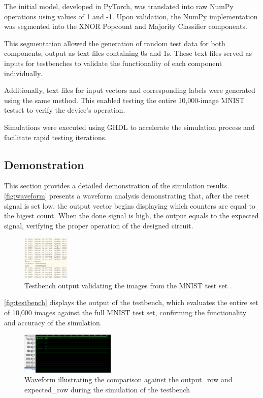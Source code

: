 \documentclass[conference]{IEEEtran}
\begin{document}
The initial model, developed in PyTorch, was translated into raw NumPy operations using values of 1 and -1. Upon validation, the NumPy implementation was segmented into the XNOR Popcount and Majority Classifier components.

This segmentation allowed the generation of random test data for both components, output as text files containing 0s and 1s. These text files served as inputs for testbenches to validate the functionality of each component individually.

Additionally, text files for input vectors and corresponding labels were generated using the same method. This enabled testing the entire 10,000-image MNIST \cite{mnist} testset to verify the device's operation.

Simulations were executed using GHDL \cite{ghdl} to accelerate the simulation process and facilitate rapid testing iterations.



\subsection{Demonstration}
This section provides a detailed demonstration of the simulation results. 
\autoref{fig:waveform} presents a waveform analysis demonstrating that, after the reset signal is set low, the output vector begins displaying which counters are equal to the higest count. When the done signal is high, the output equals to the expected signal, verifying the proper operation of the designed circuit.

\begin{figure}[h]
    \centering
    \includegraphics[width=0.2\textwidth]{./testbench.png}
    \caption{Testbench output validating the images from the MNIST test set \cite{mnist}.}
    \label{fig:testbench}
\end{figure}

\autoref{fig:testbench} displays the output of the testbench, which evaluates the entire set of 10,000 images against the full MNIST test set, confirming the functionality and accuracy of the simulation.

\begin{figure}[h]
    \centering
    \includegraphics[width=0.4\textwidth]{./Waveform_picture.png}
    \caption{Waveform illustrating the comparison against the output\_row and expected\_row during the simulation of the testbench}
    \label{fig:waveform}
\end{figure}
\end{document}
